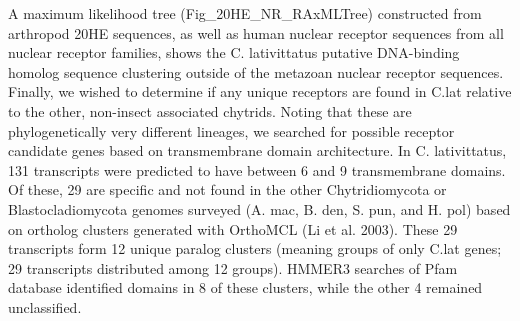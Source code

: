\indent A maximum likelihood tree (Fig\_20HE\_NR\_RAxMLTree) constructed from arthropod 20HE sequences, as well as human nuclear receptor sequences from all nuclear receptor families, shows the C. lativittatus putative DNA-binding homolog sequence clustering outside of the metazoan nuclear receptor sequences. \\
\indent Finally, we wished to determine if any unique receptors are found in C.lat relative to the other, non-insect associated chytrids. Noting that these are phylogenetically very different lineages, we searched for possible receptor candidate genes based on transmembrane domain architecture. In C. lativittatus, 131 transcripts were predicted to have between 6 and 9 transmembrane domains. Of these, 29 are specific and not found in the other Chytridiomycota or Blastocladiomycota genomes surveyed (A. mac, B. den, S. pun, and H. pol) based on ortholog clusters generated with OrthoMCL (Li et al. 2003). These 29 transcripts form 12 unique paralog clusters (meaning groups of only C.lat genes; 29 transcripts distributed among 12 groups). HMMER3 searches of Pfam database identified domains in 8 of these clusters, while the other 4 remained unclassified.\\
